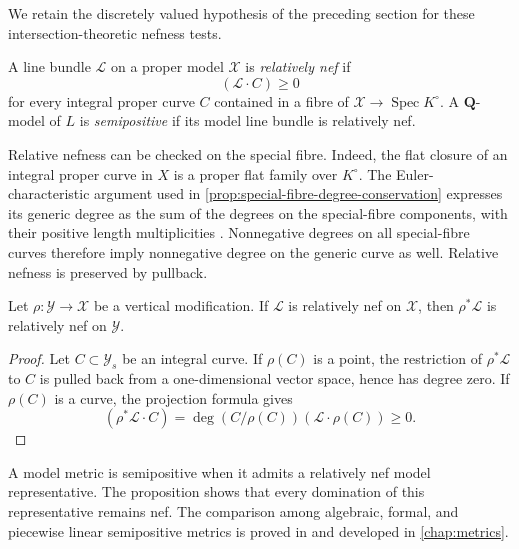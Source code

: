 We retain the discretely valued hypothesis of the preceding section for
these intersection-theoretic nefness tests.

\begin{definition}\label{def:relative-nefness-model-semipositivity}
A line bundle $\mathcal L$ on a proper model $\mathcal X$ is
\emph{relatively nef} if
\[
                            (\mathcal L\cdot C)\geq0
\]
for every integral proper curve $C$ contained in a fibre of
$\mathcal X\to\operatorname{Spec}K^\circ$. A $\mathbf Q$-model of $L$ is
\emph{semipositive} if its model line bundle is relatively nef.
\end{definition}

Relative nefness can be checked on the special fibre. Indeed, the flat
closure of an integral proper curve in $X$ is a proper flat family over
$K^\circ$. The Euler-characteristic argument used in
\cref{prop:special-fibre-degree-conservation} expresses its generic degree
as the sum of the degrees on the special-fibre components, with their
positive length multiplicities \cite[7.9.4]{EGAIII2}. Nonnegative degrees
on all special-fibre curves therefore imply nonnegative degree on the
generic curve as well. Relative nefness is preserved by pullback.

\begin{proposition}
\label{prop:nef-pullback}
Let $\rho:\mathcal Y\to\mathcal X$ be a vertical modification. If
$\mathcal L$ is relatively nef on $\mathcal X$, then $\rho^*\mathcal L$ is
relatively nef on $\mathcal Y$.
\end{proposition}
\begin{proof}
Let $C\subset\mathcal Y_s$ be an integral curve. If $\rho(C)$ is a point, the
restriction of $\rho^*\mathcal L$ to $C$ is pulled back from a one-dimensional
vector space, hence has degree zero. If $\rho(C)$ is a curve, the projection
formula gives
\[
                 (\rho^*\mathcal L\cdot C)
       =\deg(C/\rho(C))(\mathcal L\cdot\rho(C))\geq0.
\]
\end{proof}

A model metric is semipositive when it admits a relatively nef model
representative. The proposition shows that every domination of this
representative remains nef. The comparison among algebraic, formal, and piecewise linear semipositive metrics
is proved in \cite{GM19} and developed in \cref{chap:metrics}.


